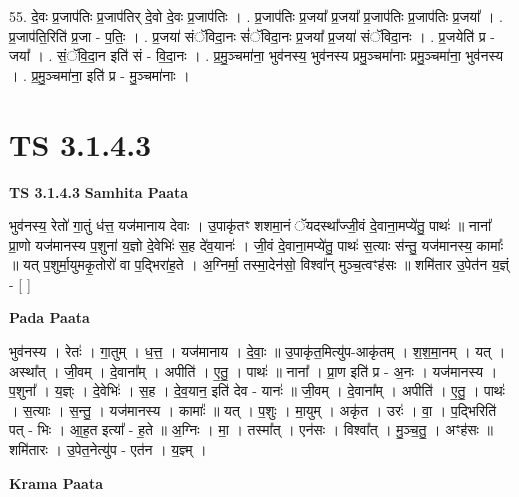 \documentclass[17pt]{extarticle}
\begin{document}
55. दे॒वः प्र॒जाप॑तिः प्र॒जाप॑तिर् दे॒वो दे॒वः प्र॒जाप॑तिः । . प्र॒जाप॑तिः प्र॒जया᳚ प्र॒जया᳚ प्र॒जाप॑तिः प्र॒जाप॑तिः प्र॒जया᳚ । . प्र॒जाप॑ति॒रिति॑ प्र॒जा - प॒तिः॒ । . प्र॒जया॑ संॅविदा॒नः सं॑ॅविदा॒नः प्र॒जया᳚ प्र॒जया॑ संॅविदा॒नः । . प्र॒जयेति॑ प्र - जया᳚ । . सं॒ॅवि॒दा॒न इति॑ सं - वि॒दा॒नः । . प्र॒मु॒ञ्चमा॑ना॒ भुव॑नस्य॒ भुव॑नस्य प्रमु॒ञ्चमा॑नाः प्रमु॒ञ्चमा॑ना॒ भुव॑नस्य । . प्र॒मु॒ञ्चमा॑ना॒ इति॑ प्र - मु॒ञ्चमा॑नाः । \newline
\pagebreak
{}

\section{ TS 3.1.4.3 }

\textbf{TS 3.1.4.3 } \newline
\textbf{Samhita Paata} \newline

भुव॑नस्य॒ रेतो॑ गा॒तुं ध॑त्त॒ यज॑मानाय देवाः । उ॒पाकृ॑तꣳ शशमा॒नं ॅयदस्था᳚ज्जी॒वं दे॒वाना॒मप्ये॑तु॒ पाथः॑ ॥ नाना᳚ प्रा॒णो यज॑मानस्य प॒शुना॑ य॒ज्ञो दे॒वेभिः॑ स॒ह दे॑व॒यानः॑ । जी॒वं दे॒वाना॒मप्ये॑तु॒ पाथः॑ स॒त्याः स॑न्तु॒ यज॑मानस्य॒ कामाः᳚ ॥ यत् प॒शुर्मा॒युमकृ॒तोरो॑ वा प॒द्भिरा॑ह॒ते । अ॒ग्निर्मा॒ तस्मा॒देन॑सो॒ विश्वा᳚न् मुञ्च॒त्वꣳह॑सः ॥ शमि॑तार उ॒पेत॑न य॒ज्ञ्ं - [  ] \newline

\textbf{Pada Paata} \newline

भुव॑नस्य । रेतः॑ । गा॒तुम् । ध॒त्त॒ । यज॑मानाय । दे॒वाः॒ ॥ उ॒पाकृ॑त॒मित्यु॑प-आकृ॑तम् । श॒श॒मा॒नम् । यत् । अस्था᳚त् । जी॒वम् । दे॒वाना᳚म् । अपीति॑ । ए॒तु॒ । पाथः॑ ॥ नाना᳚ । प्रा॒ण इति॑ प्र - अ॒नः । यज॑मानस्य । प॒शुना᳚ । य॒ज्ञ्ः । दे॒वेभिः॑ । स॒ह । दे॒व॒यान॒ इति॑ देव - यानः॑ ॥ जी॒वम् । दे॒वाना᳚म् । अपीति॑ । ए॒तु॒ । पाथः॑ । स॒त्याः । स॒न्तु॒ । यज॑मानस्य । कामाः᳚ ॥ यत् । प॒शुः । मा॒युम् । अकृ॑त । उरः॑ । वा॒ । प॒द्भिरिति॑ पत् - भिः । आ॒ह॒त इत्या᳚ - ह॒ते ॥ अ॒ग्निः । मा॒ । तस्मा᳚त् । एन॑सः । विश्वा᳚त् । मु॒ञ्च॒तु॒ । अꣳह॑सः ॥ शमि॑तारः । उ॒पेत॒नेत्यु॑प - एत॑न । य॒ज्ञ्म् ।  \newline


\textbf{Krama Paata} \newline
\end{document}
